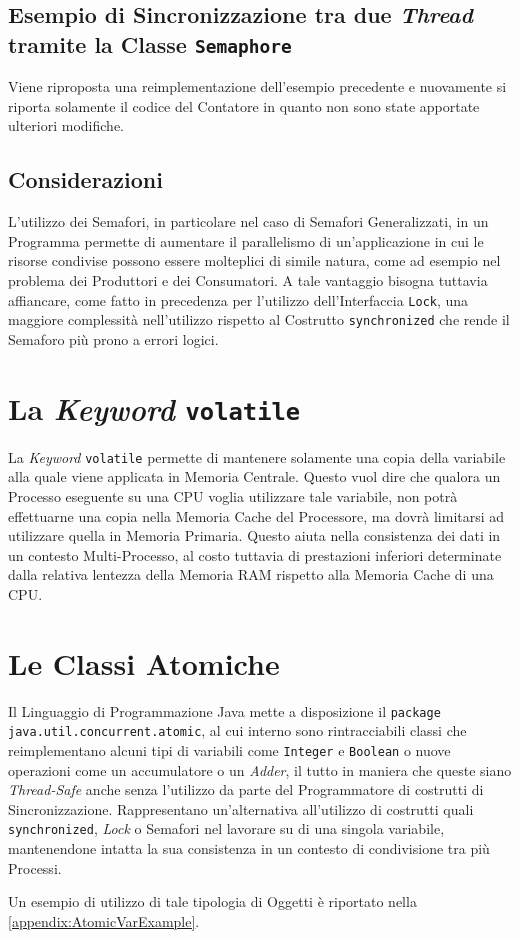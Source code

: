 \subsection{Esempio di Sincronizzazione tra due \textit{Thread} tramite la Classe \texttt{Semaphore}}
Viene riproposta una reimplementazione dell'esempio precedente e nuovamente si riporta solamente il codice del Contatore in quanto non sono state apportate ulteriori modifiche.

\subsection{Considerazioni}
L'utilizzo dei Semafori, in particolare nel caso di Semafori Generalizzati, in un Programma permette di aumentare il parallelismo di un'applicazione in cui le risorse condivise possono essere molteplici di simile natura, come ad esempio nel problema dei Produttori e dei Consumatori. A tale vantaggio bisogna tuttavia affiancare, come fatto in precedenza per l'utilizzo dell'Interfaccia \texttt{Lock}, una maggiore complessità nell'utilizzo rispetto al Costrutto \texttt{synchronized} che rende il Semaforo più prono a errori logici.

\section{La \textit{Keyword} \texttt{volatile}}
La \textit{Keyword} \texttt{volatile} permette di mantenere solamente una copia della variabile alla quale viene applicata in Memoria Centrale. Questo vuol dire che qualora un Processo eseguente su una CPU voglia utilizzare tale variabile, non potrà effettuarne una copia nella Memoria Cache del Processore, ma dovrà limitarsi ad utilizzare quella in Memoria Primaria. Questo aiuta nella consistenza dei dati in un contesto Multi-Processo, al costo tuttavia di prestazioni inferiori determinate dalla relativa lentezza della Memoria RAM rispetto alla Memoria Cache di una CPU.

\section{Le Classi Atomiche}
Il Linguaggio di Programmazione Java mette a disposizione il \texttt{package java.util.concurrent.atomic}, al cui interno sono rintracciabili classi che reimplementano alcuni tipi di variabili come \texttt{Integer} e \texttt{Boolean} o nuove operazioni come un accumulatore o un \textit{Adder}, il tutto in maniera che queste siano \textit{Thread-Safe} anche senza l'utilizzo da parte del Programmatore di costrutti di Sincronizzazione. Rappresentano un'alternativa all'utilizzo di costrutti quali \texttt{synchronized}, \textit{Lock} o Semafori nel lavorare su di una singola variabile, mantenendone intatta la sua consistenza in un contesto di condivisione tra più Processi. \par
Un esempio di utilizzo di tale tipologia di Oggetti è riportato nella \autoref{appendix:AtomicVarExample}.